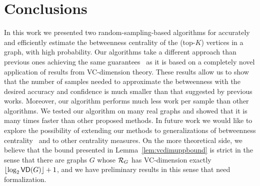 \section{Conclusions}\label{sec:concl}
In this work we presented two random-sampling-based algorithms for accurately and
efficiently estimate the betweenness centrality of the (top-$K$) vertices in a
graph, with high probability.
Our algorithms take a different approach than previous ones achieving the same
guarantees~\citep{BrandesP07,GeisbergerSS08,JacobKLPT05} as it is based on a
completely novel application of results from VC-dimension theory. These results
allow us to show that the number of samples needed to approximate the
betweenness with the desired accuracy and confidence is much smaller than that
suggested by previous works. Moreover, our algorithm performs much less work
per sample than other algorithms. We tested our algorithm on many real graphs
and showed that it is many times faster than other proposed methods. In future
work we would like to explore the possibility of extending our methods to
generalizations of betweenness centrality~\citep{DolevEP10} and to other centrality
measures. \XXX  On the more theoretical side, we believe that the bound presented in
Lemma~\ref{lem:vcdimuppbound} is strict in the sense that there are graphs $G$
whose $\mathcal{R}_G$ has VC-dimension exactly $\lfloor\log_2\mathsf{VD}(G)\rfloor+1$, and
we have preliminary results in this sense that need formalization. 

